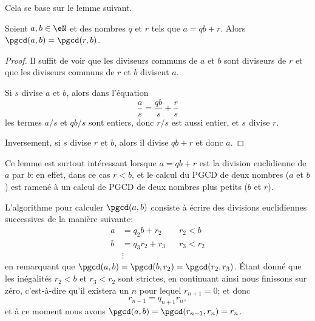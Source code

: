 Cela se base sur le lemme suivant.

\begin{lemma}       \label{LemiVqita}
	Soient \( a,b\in \eN\) et des nombres \( q\) et \( r\) tels que \( a=qb+r\). Alors \( \pgcd(a,b)=\pgcd(r,b)\).
\end{lemma}

\begin{proof}
	Il suffit de voir que les diviseurs communs de \( a\) et \( b\) sont diviseurs de \( r\) et que les diviseurs communs de \( r\) et \( b\) divisent \( a\).

	Si \( s\) divise \( a\) et \( b\), alors dans l'équation
	\begin{equation*}
		\frac{ a }{ s }=\frac{ qb }{ s }+\frac{ r }{ s }
	\end{equation*}
	les termes \( a/s\) et \( qb/s\) sont entiers, donc \( r/s\) est aussi entier, et \( s\) divise \( r\).

	Inversement, si \( s\) divise \( r\) et \( b\), alors il divise \( qb+r\) et donc \( a\).
\end{proof}
\begin{remark}
	Ce lemme est surtout intéressant lorsque \( a=qb+r\) est la division euclidienne de \( a\) par \( b\): en effet, dans ce cas \( r < b \), et le calcul du PGCD de deux nombres (\(a \) et \( b\)) est ramené à un calcul de PGCD de deux nombres plus petits (\( b\) et \( r\)).

	L'algorithme pour calculer \( \pgcd(a,b)\) consiste à écrire des divisions euclidiennes successives de la manière suivante:
	\begin{subequations}
		\begin{align}
			a & = q_2 b   + r_2 &  & r_2<b   \\
			b & = q_3 r_2 + r_3 &  & r_3<r_2 \\
			  & \vdots
		\end{align}
	\end{subequations}
	en remarquant que \( \pgcd(a,b)=\pgcd(b,r_2)=\pgcd(r_2,r_3) \). Étant donné que les inégalités \( r_2<b\) et \( r_3<r_2\) sont strictes, en continuant ainsi nous finissons sur zéro, c'est-à-dire qu'il existera un \( n\) pour lequel \( r_{n+1} = 0 \); et donc
	\begin{equation*}
		r_{n-1}=q_{n+1}r_n,
	\end{equation*}
	et à ce moment nous avons \( \pgcd(a,b)=\pgcd(r_{n-1},r_n)=r_n\).
\end{remark}


